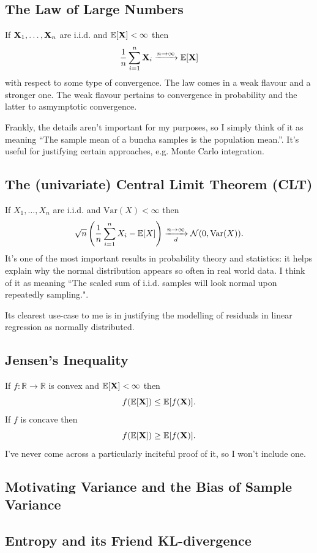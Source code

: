 \documentclass[11pt]{article}
\begin{document}
\begin{appendices}
\subsection{The Law of Large Numbers}
If $\mathbf{X}_1,\dots,\mathbf{X}_n$ are i.i.d. and $\mathbb{E}[\mathbf{X}]<\infty$ then
$$
\frac{1}{n}\sum_{i=1}^n\mathbf{X}_i
\xrightarrow{n\to\infty}
\mathbb{E}[\mathbf{X}]
$$
with respect to some type of convergence. The law comes in a weak flavour and a stronger one. The weak flavour pertains to convergence in probability and the latter to asmymptotic convergence.

Frankly, the details aren't important for my purposes, so I simply think of it as meaning ``The sample mean of a buncha samples is the population mean.''. It's useful for justifying certain approaches, e.g. Monte Carlo integration.

\subsection{The (univariate) Central Limit Theorem (CLT)}
If $X_1,\dots,X_n$ are i.i.d. and $\text{Var}(X)<\infty$ then
$$
\sqrt{n}\left(\frac{1}{n}\sum_{i=1}^nX_i-\mathbb{E}[X]\right)
\xrightarrow[d]{n\to\infty}
\mathcal{N}(0,\text{Var}(X)).
$$
It's one of the most important results in probability theory and statistics: it helps explain why the normal distribution appears so often in real world data. I think of it as meaning ``The scaled sum of i.i.d. samples will look normal upon repeatedly sampling.".

Its clearest use-case to me is in justifying the modelling of residuals in linear regression as normally distributed.

\subsection{Jensen's Inequality}
If $f:\mathbb{R}\to\mathbb{R}$ is convex and $\mathbb{E}[\mathbf{X}]<\infty$ then
$$
f(\mathbb{E}[\mathbf{X}])\leq\mathbb{E}[f(\mathbf{X})].
$$
If $f$ is concave then
$$
f(\mathbb{E}[\mathbf{X}])\geq\mathbb{E}[f(\mathbf{X})].
$$
I've never come across a particularly inciteful proof of it, so I won't include one.

\subsection{Motivating Variance and the Bias of Sample Variance}
\TODO{}

\subsection{Entropy and its Friend KL-divergence}
\label{app:entropy}


\end{appendices}
\end{document}

